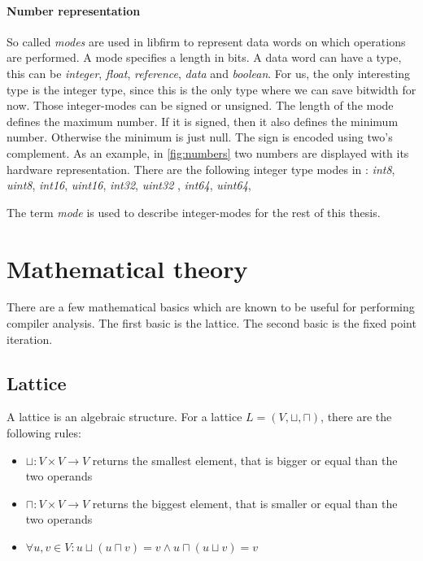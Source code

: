 \paragraph{Number representation}
So called \textit{modes} are used in libfirm to represent data words on which operations are performed. A mode specifies a length in bits. A data word can have a type, this can be \textit{integer}, \textit{float}, \textit{reference}, \textit{data} and \textit{boolean}. For us, the only interesting type is the integer type, since this is the only type where we can save bitwidth for now. Those integer-modes can be signed or unsigned. The length of the mode defines the maximum number. If it is signed, then it also defines the minimum number. Otherwise the minimum is just null. The sign is encoded using two's complement. As an example, in \autoref{fig:numbers} two numbers are displayed with its hardware representation. There are the following integer type modes in \libFIRM : 
\textit{int8},
\textit{uint8},
\textit{int16},
\textit{uint16},
\textit{int32},
\textit{uint32} ,
\textit{int64},
\textit{uint64},

The term \textit{mode} is used to describe integer-modes for the rest of this thesis.


\section{Mathematical theory}

There are a few mathematical basics which are known to be useful for performing compiler analysis. The first basic is the lattice. The second basic is the fixed point iteration.

\subsection{Lattice}

A lattice is an algebraic structure. For a lattice $L=(V,\sqcup,\sqcap)$, there are the following rules:

\begin{itemize}
	\item $\sqcup: V \times V \rightarrow V$ returns the smallest element, that is bigger or equal than the two operands
	\item $\sqcap: V \times V \rightarrow V$ returns the biggest element, that is smaller or equal than the two operands
	\item $\forall u,v \in V : u \sqcup ( u \sqcap v) = v \wedge u \sqcap ( u \sqcup v ) = v$
\end{itemize}


